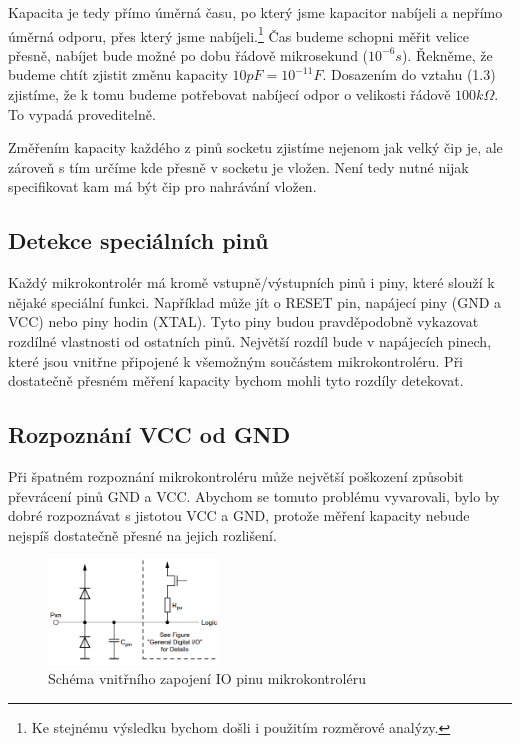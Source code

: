 \documentclass[11pt,a4paper,twoside,openright]{report}
\begin{document}
Kapacita je tedy přímo úměrná času, po který jsme kapacitor nabíjeli a nepřímo úměrná odporu, přes který jsme nabíjeli.\footnote{Ke stejnému výsledku bychom došli i použitím rozměrové analýzy.} Čas budeme schopni měřit velice přesně, nabíjet bude možné po dobu řádově mikrosekund ($10^{-6} s $). Řekněme, že budeme chtít zjistit změnu kapacity $10 pF = 10^{-11} F$. Dosazením do vztahu (1.3) zjistíme, že k tomu budeme potřebovat nabíjecí odpor o velikosti řádově $100 k\Omega$. To vypadá proveditelně.

Změřením kapacity každého z pinů socketu zjistíme nejenom jak velký čip je, ale zároveň s tím určíme kde přesně v socketu je vložen. Není tedy nutné nijak specifikovat kam má být čip pro nahrávání vložen.

\subsection {Detekce speciálních pinů}

Každý mikrokontrolér má kromě vstupně/výstupních pinů i piny, které slouží k nějaké speciální funkci. Například může jít o RESET pin, napájecí piny (GND a VCC) nebo piny hodin (XTAL). Tyto piny budou pravděpodobně vykazovat rozdílné vlastnosti od ostatních pinů. Největší rozdíl bude v napájecích pinech, které jsou vnitřne připojené k všemožným součástem mikrokontroléru. Při dostatečně přesném měření kapacity bychom mohli tyto rozdíly detekovat.

\subsection {Rozpoznání VCC od GND\label{VCCvsGND}}

Při špatném rozpoznání mikrokontroléru může největší poškození způsobit převrácení pinů GND a VCC. Abychom se tomuto problému vyvarovali, bylo by dobré rozpoznávat s jistotou VCC a GND, protože měření kapacity nebude nejspíš dostatečně přesné na jejich rozlišení. 

\begin{figure}[ht!]
  \includegraphics[width=0.4\textwidth]{img/pin_diagram.png}
  \centering
  \caption{Schéma vnitřního zapojení IO pinu mikrokontroléru \cite[str.~58]{atmega328}}
  \label{fig:pin_diagram}
\end{figure}
\end{document}

